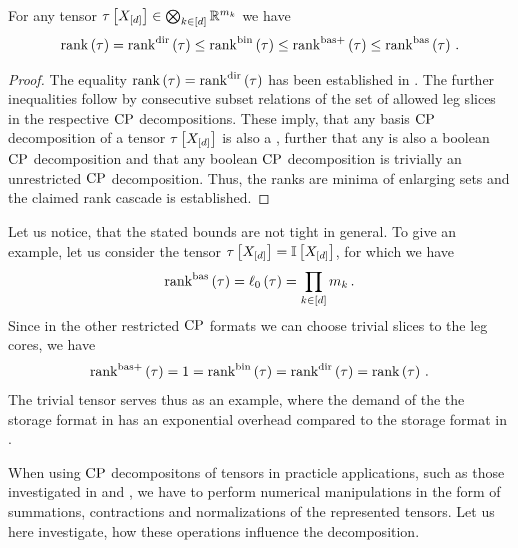 \begin{theorem}
    \label{the:rankCascade}
    For any tensor $\tau\left[X_{[d]}\right]\in\bigotimes_{k\in[d]} \mathbb{R}^{m_{k}}$ we have
    \begin{align*}
        \mathrm{rank}\left(\tau\right) = \mathrm{rank}^{\mathrm{dir}}\left(\tau\right) \leq \mathrm{rank}^{\mathrm{bin}}\left(\tau\right) \leq \mathrm{rank}^{\mathrm{bas+}}\left(\tau\right) \leq \mathrm{rank}^{\mathrm{bas}}\left(\tau\right) \, .
    \end{align*}
\end{theorem}
\begin{proof}
    The equality $\mathrm{rank}\left(\tau\right) = \mathrm{rank}^{\mathrm{dir}}\left(\tau\right)$ has been established in .
    The further inequalities follow by consecutive subset relations of the set of allowed leg slices in the respective $\mathrm{CP}$ decompositions.
    These imply, that any basis $\mathrm{CP}$ decomposition of a tensor $\tau\left[X_{[d]}\right]$ is also a \basplusDecomposition{}, further that any \basplusDecomposition{} is also a boolean $\mathrm{CP}$ decomposition and that any boolean $\mathrm{CP}$ decomposition is trivially an unrestricted $\mathrm{CP}$ decomposition.
    Thus, the ranks are minima of enlarging sets and the claimed rank cascade is established.
\end{proof}

Let us notice, that the stated bounds are not tight in general.
To give an example, let us consider the tensor $\tau\left[X_{[d]}\right]=\mathbb{I}\left[X_{[d]}\right]$, for which we have
\begin{align*}
    \mathrm{rank}^{\mathrm{bas}}\left(\tau\right) = \ell_0\left(\tau\right) = \prod_{k\in[d]}m_{k} \, .
\end{align*}
Since in the other restricted $\mathrm{CP}$ formats we can choose trivial slices to the leg cores, we have
\begin{align*}
    \mathrm{rank}^{\mathrm{bas+}}\left(\tau\right) = 1 = \mathrm{rank}^{\mathrm{bin}}\left(\tau\right) = \mathrm{rank}^{\mathrm{dir}}\left(\tau\right) = \mathrm{rank}\left(\tau\right) \, .
\end{align*}
The trivial tensor serves thus as an example, where the demand of the the storage format in  has an exponential overhead compared to the storage format in .



When using $\mathrm{CP}$ decompositons of tensors in practicle applications, such as those investigated in  and , we have to perform numerical manipulations in the form of summations, contractions and normalizations of the represented tensors.
Let us here investigate, how these operations influence the decomposition.

